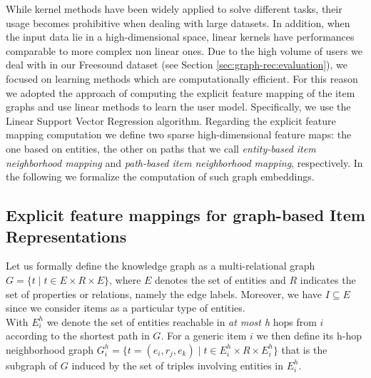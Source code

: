 While kernel methods have been widely applied to solve different tasks, their usage becomes prohibitive when dealing with large datasets. 
In addition, when the input data lie in a high-dimensional space, linear kernels have performances comparable to more complex non linear ones. 
Due to the high volume of users we deal with in our Freesound dataset (see Section \ref{sec:graph-rec:evaluation}), we focused on learning methods which are computationally efficient. For this reason we adopted the approach of computing the explicit feature mapping of the item graphs and use linear methods to learn the user model. Specifically, we use the Linear Support Vector Regression \cite{HoL12} algorithm. 
Regarding the explicit feature mapping computation we define two sparse high-dimensional feature maps: the one based on entities, the other on paths that we call \textit{entity-based item neighborhood mapping} and \textit{path-based item neighborhood mapping}, respectively. In the following we formalize the computation of such graph embeddings. 
\subsection{Explicit feature mappings for graph-based Item Representations}
Let us formally define the knowledge graph as a multi-relational graph $G=\lbrace t \mid t \in E \times R \times E \rbrace$, where $E$ denotes the set of entities and $R$ indicates the set of properties or relations, namely the edge labels. Moreover, we have $I \subseteq E$ since we consider items as a particular type of entities.\\
With $E^h_i$ we denote the set of entities reachable in \textit{at most h} hops from $i$ according to the shortest path in $G$. For a generic item $i$ we then define its h-hop neighborhood graph $G^h_i=\lbrace t=(e_i,r_j,e_k) \mid t \in E^h_i \times R \times E^h_i \rbrace$ that is the subgraph of $G$ induced by the set of triples involving entities in $E^h_i$. 

